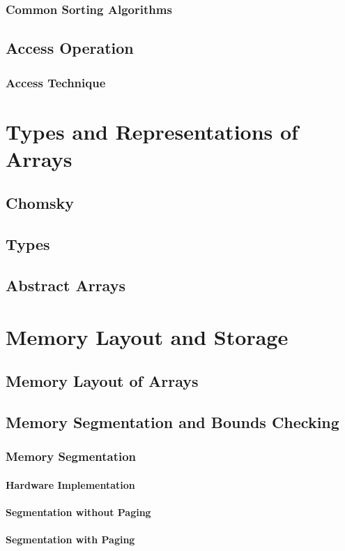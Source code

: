 \documentclass[12pt, oneside]{book}
\begin{document}
\subsection*{Common Sorting Algorithms}
\section{Access Operation}
\subsection*{Access Technique}
\chapter{Types and Representations of Arrays}
\section{Chomsky}
\section{Types}
\section{Abstract Arrays}
\chapter{Memory Layout and Storage}
\section{Memory Layout of Arrays}
\section{Memory Segmentation and Bounds Checking}
\subsection{Memory Segmentation}
\subsubsection{Hardware Implementation}
\subsubsection{Segmentation without Paging}
\subsubsection{Segmentation with Paging}
\end{document}
